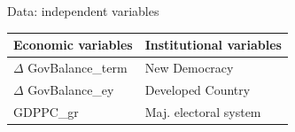 \documentclass{beamer}
\begin{document}
\begin{frame}{Data: independent variables}
 \begin{table}
 \begin{adjustbox}{width=0.9\textwidth}
\begin{tabular}{l|l}
\toprule
\textbf{Economic variables} & \textbf{Institutional variables}\\
\midrule
 $\Delta$ GovBalance\_term & New Democracy \\
 $\Delta$ GovBalance\_ey & Developed Country\\
GDPPC\_gr  &  Maj. electoral system \\

\bottomrule
\end{tabular}
\end{adjustbox}
\end{table}


\end{frame}
\end{document}

